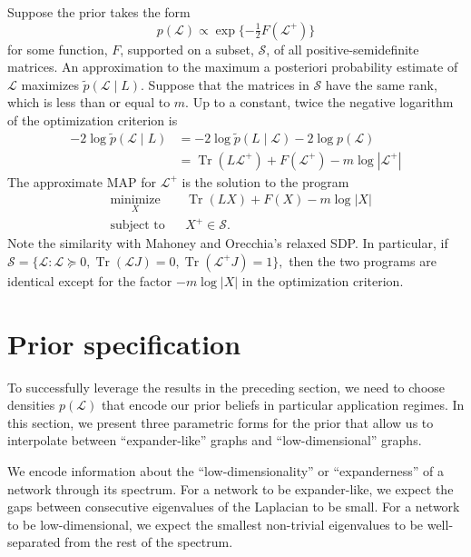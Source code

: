 \documentclass[12pt]{article}
\DeclareMathOperator*{\Tr}{Tr}
\theoremstyle{plain}
\begin{document}
Suppose the prior takes the form
\[
  p(\mathcal{L}) \propto \exp\{ -\tfrac{1}{2} F(\mathcal{L^+}) \}
\]
for some function, $F$, supported on a subset, $\mathcal{S}$, of all
positive-semidefinite matrices.  An approximation to the
maximum a posteriori probability estimate of $\mathcal{L}$ maximizes
$\tilde p(\mathcal{L} \mid L)$.  Suppose that the
matrices in $\mathcal{S}$ have the same rank, which is less than or
equal to $m$.
Up to a constant, twice the negative logarithm of the optimization criterion is
\begin{align*}
  -2 \log \tilde p(\mathcal{L} \mid L)
   &= - 2 \log \tilde p(L \mid \mathcal{L}) - 2 \log p(\mathcal{L}) \\
   &= \Tr(L \mathcal{L}^+) + F(\mathcal{L^+}) - m \log | \mathcal{L}^+ |
\end{align*}
The approximate MAP for $\mathcal{L}^+$ is the solution to the program
\[
\begin{aligned}
  & \underset{X}{\text{minimize}}
  & & \Tr(L X) + F(X) - m \log |X| \\
  & \text{subject to}
  & & X^+ \in \mathcal{S}.
\end{aligned}
\]
Note the similarity with Mahoney and Orecchia's relaxed SDP.
In particular, if
\(
  \mathcal{S} = \{ \mathcal{L} : \mathcal{L} \succeq 0,
  \Tr(\mathcal{L} J) = 0, \Tr(\mathcal{L}^{+} J) = 1 \},
\)
then the two programs are identical except for the factor
$-m \log |X|$ in the optimization criterion.


\section{Prior specification}

To successfully leverage the results in the preceding section, we need
to choose densities $p(\mathcal{L})$ that encode our prior beliefs in
particular application regimes.  In this section, we present three
parametric forms for the prior that allow us to interpolate between
``expander-like'' graphs and ``low-dimensional'' graphs.

We encode information about the
``low-dimensionality'' or ``expanderness'' of a network through its
spectrum.  For a network to be expander-like, we expect the gaps
between consecutive eigenvalues of the Laplacian to be small.  For a
network to be low-dimensional, we expect the smallest non-trivial
eigenvalues to be well-separated from the rest of the spectrum.
\end{document}
